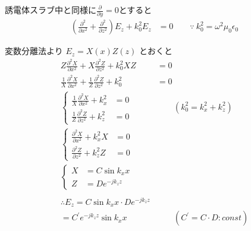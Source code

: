 \documentclass[a4paper,10pt]{bxjsarticle}
\begin{document}
誘電体スラブ中と同様に$\frac{\partial}{\partial y} = 0$とすると
\begin{align*}
    \left( 
        \frac{\partial^2}{\partial x^2} 
        + \frac{\partial^2}{\partial z^2} 
    \right) E_z
    + k_0^2 E_z
    & = 0 \qquad
    \because \ k_0^2 = \omega^2 \mu_0 \epsilon_0
\end{align*}

変数分離法より $ E_z = X(x) Z(z) $ とおくと
\begin{align*}
      Z \frac{\partial^2 X}{\partial x^2} 
    + X \frac{\partial^2 Z}{\partial z^2}
    + k_0^2 X Z
    & = 0 \\
      \frac{1}{X} \frac{\partial^2 X}{\partial x^2} 
    + \frac{1}{Z} \frac{\partial^2 Z}{\partial z^2}
    + k_0^2
    & = 0 \\
    \begin{cases}
        \frac{1}{X} \frac{\partial^2 X}{\partial x^2} + k_x^2 &= 0 \\
        \frac{1}{Z} \frac{\partial^2 Z}{\partial z^2} + k_z^2 &= 0 
    \end{cases} & \qquad
    ( k_0^2 = k_x^2 + k_z^2 ) \\
    \begin{cases}
        \frac{\partial^2 X}{\partial x^2} + k_x^2 X &= 0 \\
        \frac{\partial^2 Z}{\partial z^2} + k_z^2 Z &= 0 
    \end{cases} & \\
    \begin{cases}
        X &= C \sin k_x x \\
        Z &= D e^{-jk_z z} 
    \end{cases} & \\
    \\
    \therefore E_z 
        = C \sin k_x x \cdot D e^{-jk_z z} & \\
        = C^\prime e^{-jk_z z} \sin k_x x & \qquad (C^\prime = C \cdot D : const)
\end{align*}




  
\end{document}
